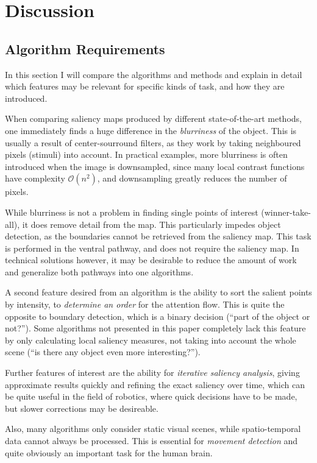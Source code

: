 \documentclass[a4paper,12pt,fleqn,oneside]{scrartcl}
\begin{document}
\section{Discussion}

\subsection{Algorithm Requirements}

In this section I will compare the algorithms and methods and explain in detail which features may be relevant for
specific kinds of task, and how they are introduced.

When comparing saliency maps produced by different state-of-the-art methods, one immediately finds a huge difference in
the \emph{blurriness} of the object. This is usually a result of center-sourround filters, as they work by taking
neighboured pixels (stimuli) into account. In practical examples, more blurriness is often introduced when the image is
downsampled, since many local contrast functions have complexity $\mathcal{O}(n^2)$, and downsampling greatly reduces
the number of pixels.

While blurriness is not a problem in finding single points of interest (winner-take-all), it does remove detail from the
map. This particularly impedes object detection, as the boundaries cannot be retrieved from the saliency map. This
task is performed in the ventral pathway, and does not require the saliency map. In technical solutions however, it may be
desirable to reduce the amount of work and generalize both pathways into one algorithms.

A second feature desired from an algorithm is the ability to sort the salient points by intensity, to \emph{determine an
order} for the attention flow. This is quite the opposite to boundary detection, which is a binary decision (``part of
the object or not?''). Some algorithms not presented in this paper completely lack this feature by only calculating 
local saliency measures, not taking into account the whole scene (``is there any object even more interesting?'').

Further features of interest are the ability for \emph{iterative saliency analysis}, giving approximate results quickly
and  refining the exact saliency over time, which can be quite useful in the field of robotics, where quick decisions
have to be made, but slower corrections may be desireable.

Also, many algorithms only consider static visual scenes, while spatio-temporal data cannot always be processed. This is
essential for \emph{movement detection} and quite obviously an important task for the human brain.
\end{document}

